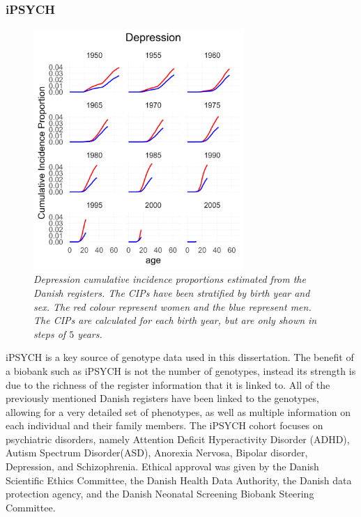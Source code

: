 \subsubsection{iPSYCH}
\begin{figure}
	\includegraphics[width=8cm]{methods/prevalencePlot_DEP.png}
	\caption[Cumulative incidence proportions from the Danish 
	Registers]{
		\sl Depression cumulative incidence proportions estimated from the 
		Danish registers. The CIPs have been stratified by birth year and sex. The 
		red colour represent women and the blue represent men. The CIPs are 
		calculated for each birth year, but are only shown in steps of $ 
		5 $ years.}
	\label{fig:CIP_DEP}
\end{figure}
iPSYCH is a key source of genotype data used in this dissertation. The benefit of a biobank such as iPSYCH is not the number of genotypes, instead its strength is due to the richness of the register information that it is linked to. All of the previously mentioned Danish registers have been linked to the genotypes, allowing for a very detailed set of phenotypes, as well as multiple information on each individual and their family members. The iPSYCH cohort focuses on psychiatric disorders, namely Attention Deficit Hyperactivity Disorder (ADHD), Autism Spectrum Disorder(ASD), Anorexia Nervosa, Bipolar disorder, Depression, and Schizophrenia\cite{pedersen2018ipsych2012}. Ethical approval was given by the Danish Scientific Ethics Committee, the Danish Health Data Authority, the Danish data protection agency, and the Danish Neonatal Screening Biobank Steering Committee.

